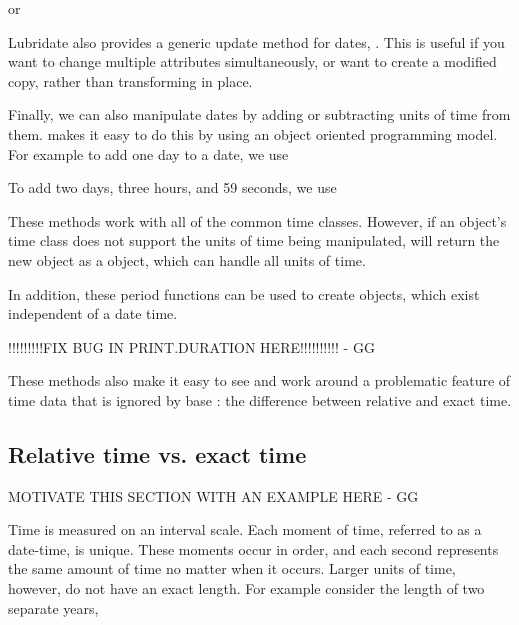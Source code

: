 \documentclass[article]{jss}
\begin{document}

or


Lubridate also provides a generic update method for dates, .  This is useful if you want to change multiple attributes simultaneously, or want to create a modified copy, rather than transforming in place.


Finally, we can also manipulate dates by adding or subtracting units of time from them.  makes it easy to do this by using an object oriented programming model. For example to add one day to a date, we use


To add two days, three hours, and 59 seconds, we use


These methods work with all of the common time classes. However, if an object's time class does not support the units of time being manipulated,  will return the new object as a  object, which can handle all units of time.

In addition, these period functions can be used to create  objects, which exist independent of a date time.


!!!!!!!!!FIX BUG IN PRINT.DURATION HERE!!!!!!!!!! - GG

These methods also make it easy to see and work around a problematic feature of time data that is ignored by base : the difference between relative and exact time.


\subsection{Relative time vs. exact time}

MOTIVATE THIS SECTION WITH AN EXAMPLE HERE - GG

Time is measured on an interval scale. Each moment of time, referred to as a date-time, is unique.  These moments occur in order, and each second represents the same amount of time no matter when it occurs.  Larger units of time, however, do not have an exact length. For example consider the length of two separate years,
\end{document}
